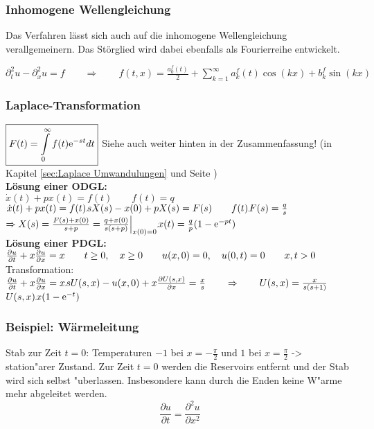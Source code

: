 \subsubsection{Inhomogene Wellengleichung}

Das Verfahren lässt sich auch auf die inhomogene Wellengleichung verallgemeinern. Das Störglied wird dabei ebenfalls als Fourierreihe entwickelt.

$\partial_t^2u-\partial_x^2u=f \qquad \Rightarrow \qquad f(t,x)=\frac{a_0^f(t)}{2}+\sum\limits_{k=1}^{\infty}{a^f_k(t)\cos(kx)+b^f_k\sin(kx)}$



\subsubsection{Laplace-Transformation}

$\boxed{F(t)=\int\limits_{0}^{\infty}{f(t)\mathrm{e}^{-st}} dt}$ \qquad Siehe auch weiter hinten in der Zusammenfassung! (in Kapitel \ref{sec:Laplace Umwandulungen} und Seite \pageref{sec:Laplace Umwandulungen})\\

\textbf{Lösung einer ODGL:}\\

$\dot{x}(t)+p x(t)=f(t) \qquad f(t)=q$\\
$\dot{x}(t)+p x(t)=f(t)\FT s X(s)-x(0)+pX(s)=F(s) \qquad f(t)\FT F(s)=\frac{q}{s}$\\

$\Rightarrow X(s)=\frac{F(s)+x(0)}{s+p}=\frac{q+x(0)}{s(s+p)}\Big|_{x(0)=0}\IFT x(t)=\frac{q}{p}(1-\e^{-pt})$\\

\textbf{Lösung einer PDGL:}\\

$\frac{\partial u}{\partial t}+x\frac{\partial u}{\partial x}=x\qquad t\geq 0,\quad x\geq 0\qquad u(x,0)=0,\quad u(0,t)=0\qquad x,t>0$\\

Transformation: $\partFrac{u}{t}+x\partFrac{u}{x}=x\FT sU(s,x)-u(x,0)+x\partFrac{U(s,x)}{x}=\frac{x}{s}\qquad \Rightarrow \qquad U(s,x)=\frac{x}{s(s+1)}$\\
$U(s,x)\IFT x(1-\e^{-t})$

\subsubsection{Beispiel: Wärmeleitung}

Stab zur Zeit $t=0$: Temperaturen $-1$ bei $x=-\frac{\pi}2$ und
$1$ bei $x=\frac{\pi}2$ -> station"arer Zustand.
Zur Zeit $t=0$ werden die Reservoirs entfernt und der
Stab wird sich selbst "uberlassen. Insbesondere kann durch die
Enden keine W"arme mehr abgeleitet werden.
\[
\frac{\partial u}{\partial t}=\frac{\partial^2 u}{\partial x^2}
\]

